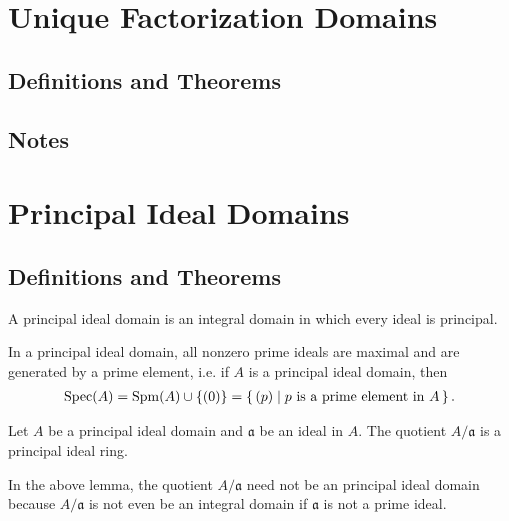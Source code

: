 \newpage
\section{Unique Factorization Domains}
\subsection*{Definitions and Theorems}
\subsection*{Notes}

\newpage
\section{Principal Ideal Domains}
\subsection*{Definitions and Theorems}

\begin{defbox}
    \begin{definition}
        A principal ideal domain is an integral domain in which every ideal is principal.
    \end{definition}
\end{defbox}

\begin{thmbox}
    \begin{lemma}
        In a principal ideal domain, all nonzero prime ideals are maximal and are generated by a prime element, i.e. if \(A\) is a principal ideal domain, then
        \begin{align*}
            \mathrm{Spec}(A) = \mathrm{Spm}(A) \cup \{(0)\} = \left\{\, (p) \mid p \text{ is a prime element in } A \,\right\} \text{.}
        \end{align*}
    \end{lemma}
\end{thmbox}

\begin{thmbox}
    \begin{lemma}
        Let \(A\) be a principal ideal domain and \(\mathfrak{a}\) be an ideal in \(A\). The quotient \(A/\mathfrak{a}\) is a principal ideal ring.
    \end{lemma}
\end{thmbox}

\begin{rembox}
    \begin{remark}
        In the above lemma, the quotient \(A / \mathfrak{a}\) need not be an principal ideal domain because \(A / \mathfrak{a}\) is not even be an integral domain if \(\mathfrak{a}\) is not a prime ideal.
    \end{remark}
\end{rembox}

